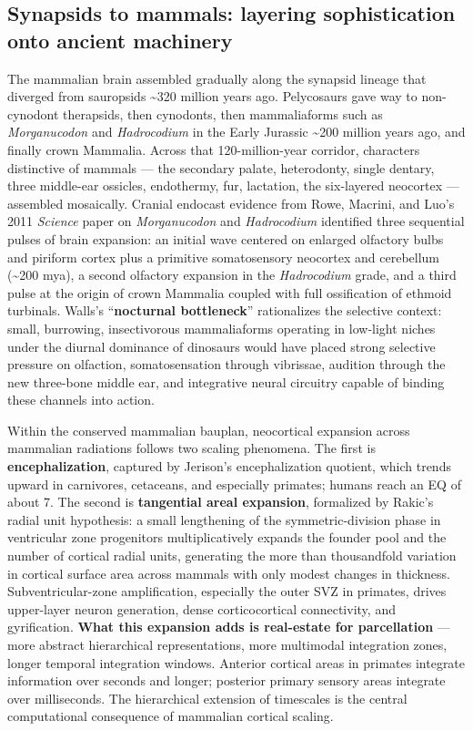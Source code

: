 \subsection{Synapsids to mammals: layering sophistication onto ancient machinery}\label{05_vertebrates-synapsids-to-mammals-layering-sophistication-onto-ancient-machinery}

The mammalian brain assembled gradually along the synapsid lineage that diverged from sauropsids \textasciitilde320 million years ago. Pelycosaurs gave way to non-cynodont therapsids, then cynodonts, then mammaliaforms such as \emph{Morganucodon} and \emph{Hadrocodium} in the Early Jurassic \textasciitilde200 million years ago, and finally crown Mammalia. Across that 120-million-year corridor, characters distinctive of mammals --- the secondary palate, heterodonty, single dentary, three middle-ear ossicles, endothermy, fur, lactation, the six-layered neocortex --- assembled mosaically. Cranial endocast evidence from Rowe, Macrini, and Luo's 2011 \emph{Science} paper on \emph{Morganucodon} and \emph{Hadrocodium} identified three sequential pulses of brain expansion: an initial wave centered on enlarged olfactory bulbs and piriform cortex plus a primitive somatosensory neocortex and cerebellum (\textasciitilde200 mya), a second olfactory expansion in the \emph{Hadrocodium} grade, and a third pulse at the origin of crown Mammalia coupled with full ossification of ethmoid turbinals. Walls's ``\textbf{nocturnal bottleneck}'' rationalizes the selective context: small, burrowing, insectivorous mammaliaforms operating in low-light niches under the diurnal dominance of dinosaurs would have placed strong selective pressure on olfaction, somatosensation through vibrissae, audition through the new three-bone middle ear, and integrative neural circuitry capable of binding these channels into action.

Within the conserved mammalian bauplan, neocortical expansion across mammalian radiations follows two scaling phenomena. The first is \textbf{encephalization}, captured by Jerison's encephalization quotient, which trends upward in carnivores, cetaceans, and especially primates; humans reach an EQ of about 7. The second is \textbf{tangential areal expansion}, formalized by Rakic's radial unit hypothesis: a small lengthening of the symmetric-division phase in ventricular zone progenitors multiplicatively expands the founder pool and the number of cortical radial units, generating the more than thousandfold variation in cortical surface area across mammals with only modest changes in thickness. Subventricular-zone amplification, especially the outer SVZ in primates, drives upper-layer neuron generation, dense corticocortical connectivity, and gyrification. \textbf{What this expansion adds is real-estate for parcellation} --- more abstract hierarchical representations, more multimodal integration zones, longer temporal integration windows. Anterior cortical areas in primates integrate information over seconds and longer; posterior primary sensory areas integrate over milliseconds. The hierarchical extension of timescales is the central computational consequence of mammalian cortical scaling.

